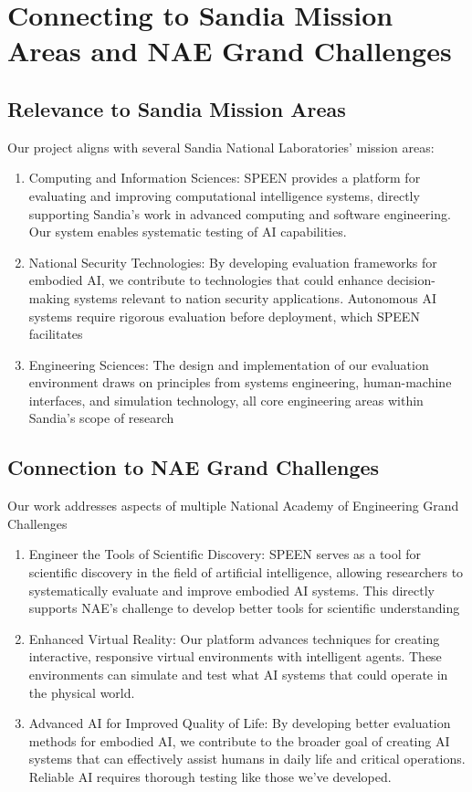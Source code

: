 \documentclass{article}
\begin{document}
\section{Connecting to Sandia Mission Areas and NAE Grand Challenges}
\subsection{Relevance to Sandia Mission Areas}
Our project aligns with several Sandia National Laboratories' mission areas:
\begin{enumerate}
    \item Computing and Information Sciences: SPEEN provides a platform for evaluating and improving computational intelligence systems, directly supporting Sandia's work in advanced computing and software engineering.
          Our system enables systematic testing of AI capabilities.
    \item National Security Technologies: By developing evaluation frameworks for embodied AI, we contribute to technologies that could enhance decision-making systems relevant to nation security applications.
          Autonomous AI systems require rigorous evaluation before deployment, which SPEEN facilitates
    \item Engineering Sciences: The design and implementation of our evaluation environment draws on principles from systems engineering, human-machine interfaces, and simulation technology, all core engineering areas within Sandia's scope of research
\end{enumerate}

\subsection{Connection to NAE Grand Challenges}
Our work addresses aspects of multiple National Academy of Engineering Grand Challenges
\begin{enumerate}
    \item Engineer the Tools of Scientific Discovery: SPEEN serves as a tool for scientific discovery in the field of artificial intelligence, allowing researchers to systematically evaluate and improve embodied AI systems.
          This directly supports NAE's challenge to develop better tools for scientific understanding
    \item Enhanced Virtual Reality: Our platform advances techniques for creating interactive, responsive virtual environments with intelligent agents.
          These environments can simulate and test what AI systems that could operate in the physical world.
    \item Advanced AI for Improved Quality of Life: By developing better evaluation methods for embodied AI, we contribute to the broader goal of creating AI systems that can effectively assist humans in daily life and critical operations.
          Reliable AI requires thorough testing like those we've developed.
\end{enumerate}
\end{document}
